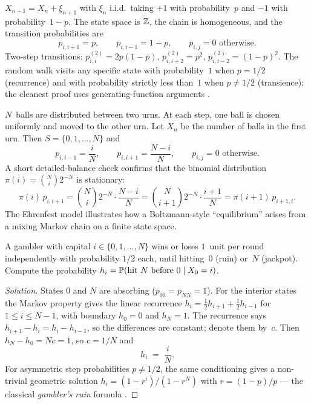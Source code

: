 \begin{example}
\label{ex:rw-on-Z}
$X_{n+1} = X_n + \xi_{n+1}$ with $\xi_n$ i.i.d.\ taking $+1$ with
probability~$p$ and $-1$ with probability~$1 - p$. The state space
is $\mathbb{Z}$, the chain is homogeneous, and the transition probabilities
are
\[
  p_{i, i+1} = p, \qquad p_{i, i-1} = 1 - p, \qquad p_{i, j} = 0 \text{ otherwise}.
\]
Two-step transitions: $p_{i, i}^{(2)} = 2 p (1 - p)$,
$p_{i, i+2}^{(2)} = p^2$, $p_{i, i-2}^{(2)} = (1-p)^2$. The
random walk visits any specific state with probability~$1$ when
$p = 1/2$ (recurrence) and with probability strictly less
than~$1$ when $p \neq 1/2$ (transience); the cleanest proof uses
generating-function arguments \cite[Ch.~XII]{Sevastyanov1982}.
\end{example}

\begin{example}
\label{ex:ehrenfest}
$N$~balls are distributed between two urns. At each step, one ball
is chosen uniformly and moved to the other urn. Let $X_n$ be the
number of balls in the first urn. Then $S = \{0, 1, \dots, N\}$
and
\[
  p_{i, i-1} = \frac{i}{N}, \qquad p_{i, i+1} = \frac{N - i}{N}, \qquad p_{i, j} = 0 \text{ otherwise}.
\]
A short detailed-balance check confirms that the binomial
distribution $\pi(i) = \binom{N}{i} 2^{-N}$ is stationary:
\[
  \pi(i)\, p_{i, i+1} = \binom{N}{i} 2^{-N} \cdot \frac{N - i}{N} = \binom{N}{i+1} 2^{-N} \cdot \frac{i + 1}{N} = \pi(i + 1)\, p_{i+1, i}.
\]
The Ehrenfest model illustrates how a Boltzmann-style
``equilibrium'' arises from a mixing Markov chain on a finite
state space.
\end{example}

\begin{problem}
\label{prob:absorbing-chain}
A gambler with capital $i \in \{0, 1, \dots, N\}$ wins or loses
$1$~unit per round independently with probability $1/2$ each, until
hitting~$0$ (ruin) or~$N$ (jackpot). Compute the probability
$h_i = \mathbb{P}(\text{hit } N \text{ before } 0 \mid X_0 = i)$.
\end{problem}

\begin{proof}[Solution]
States $0$ and $N$ are absorbing ($p_{00} = p_{NN} = 1$). For the
interior states the Markov property gives the linear recurrence
$h_i = \tfrac{1}{2} h_{i+1} + \tfrac{1}{2} h_{i-1}$ for
$1 \leq i \leq N - 1$, with boundary $h_0 = 0$ and $h_N = 1$. The
recurrence says $h_{i+1} - h_i = h_i - h_{i-1}$, so the differences
are constant; denote them by~$c$. Then $h_N - h_0 = N c = 1$, so
$c = 1/N$ and
\[
  h_i \;=\; \frac{i}{N}.
\]
For asymmetric step probabilities $p \neq 1/2$, the same conditioning
gives a non-trivial geometric solution
$h_i = (1 - r^i)/(1 - r^N)$ with $r = (1 - p)/p$ — the classical
\emph{gambler's ruin} formula \cite[Ch.~VI, \S~3]{Shiryaev1989}.
\end{proof}
